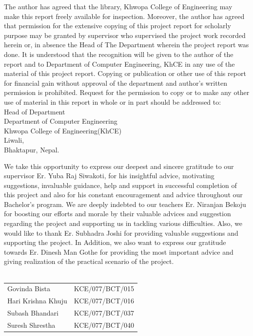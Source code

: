 		\large
		\normalsize
		\justify
		The author has agreed that the library, Khwopa College of Engineering may make this report freely available for inspection. Moreover, the author
has agreed that permission for the extensive copying of this project report for scholarly
purpose may be granted by supervisor who supervised the project work recorded herein
or, in absence the Head of The Department wherein the project report was done. It is
understood that the recognition will be given to the author of the report and to
Department of Computer Engineering, KhCE in
any use of the material of this project report. Copying or publication or other use of this
report for financial gain without approval of the department and author’s written
permission is prohibited. Request for the permission to copy or to make any other use
of material in this report in whole or in part should be addressed to:
\vspace{1.5cm}\\
Head of Department\\
Department of Computer Engineering\\
Khwopa College of Engineering(KhCE)\\
Liwali,\\
Bhaktapur, Nepal.\\
		\break

	
		\large
		\normalsize
		\justify
			We take this opportunity to express our deepest and sincere gratitude to our supervisor
Er. Yuba Raj Siwakoti, for his insightful advice, motivating suggestions, invaluable
guidance, help and support in successful completion of this project and also for his
constant encouragement and advice throughout our Bachelor’s program.
We are deeply indebted to our teachers Er. Niranjan Bekoju for
boosting our efforts and morale by their valuable advices and suggestion regarding the
project and supporting us in tackling various difficulties.
Also, we would like to thank Er. Subhadra Joshi for providing valuable suggestions and
supporting the project.
In Addition, we also want to express our gratitude towards Er. Dinesh Man Gothe for
providing the most important advice and giving realization of the practical scenario of
the project.\\
\\ 
        \begin{table}[hbt!]
            \begin{tabular}{l l}
				Govinda Bista & KCE/077/BCT/015\\
				Hari Krishna Khuju & KCE/077/BCT/016\\
				Subash Bhandari & KCE/077/BCT/037\\
				Suresh Shrestha & KCE/077/BCT/040\\
		    \end{tabular}
        \end{table}
		\break
